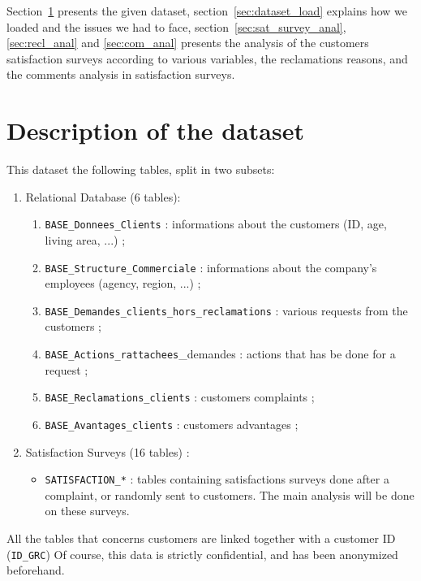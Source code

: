 \documentclass[a4paper, 11pt]{article}
\newcommand{\tw}[1]{\texttt{#1}}
\begin{document}
    Section~\ref{sec:data_descr} presents the given dataset, section~\ref{sec:dataset_load} explains how we loaded and the issues we had to face, section~\ref{sec:sat_survey_anal},\ref{sec:recl_anal} and \ref{sec:com_anal} presents the analysis of the customers satisfaction surveys according to various variables, the reclamations reasons, and the comments analysis in satisfaction surveys.

\section{Description of the dataset} %
\label{sec:data_descr}


	This dataset the following tables, split in two subsets:
    \begin{enumerate}
    	\item Relational Database (6 tables):
    	\begin{enumerate}%
            \item \tw{BASE\_Donnees\_Clients} : informations about the customers (ID, age, living area, ...) ;
            \item \tw{BASE\_Structure\_Commerciale} : informations about the company's employees (agency, region, ...) ;
            \item \tw{BASE\_Demandes\_clients\_hors\_reclamations} : various requests from the customers ;
            \item \tw{BASE\_Actions\_rattachees}\_demandes : actions that has be done for a request ;
            \item \tw{BASE\_Reclamations\_clients} : customers complaints ;
            \item \tw{BASE\_Avantages\_clients} : customers advantages ;
        \end{enumerate}
        \item Satisfaction Surveys (16 tables) :
        \begin{itemize}
        	\item \tw{SATISFACTION\_*} : tables containing satisfactions surveys done after a complaint, or randomly sent to customers. The main analysis will be done on these surveys.
        \end{itemize}
	\end{enumerate}
    All the tables that concerns customers are linked together with a customer ID (\tw{ID\_GRC})
    Of course, this data is strictly confidential, and has been anonymized beforehand. 
\end{document}
